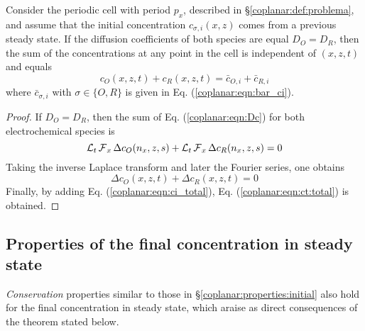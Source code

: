 \begin{corolario}
	\label{coplanar:cor:ct:total}
	Consider the periodic cell with period $p_{x}$,
	described in \S\ref{coplanar:def:problema},
	and assume that the initial concentration $c_{\sigma,i}(x,z)$ comes from a previous steady state.
	If the diffusion coefficients of both species are equal $D_{O} = D_{R}$,
	then the sum of the concentrations at any point in the cell is independent of $(x,z,t)$ and equals
	\begin{equation}
		\label{coplanar:eqn:ct:total}
		c_{O}(x,z,t) + c_{R}(x,z,t) = \bar{c}_{O,i} + \bar{c}_{R,i}
	\end{equation}
	where $\bar{c}_{\sigma,i}$ with $\sigma \in \{O,R\}$ is given in Eq. (\ref{coplanar:eqn:bar_ci}).
\end{corolario}

\begin{proof}
	If $D_{O} = D_{R}$, then the sum of Eq. (\ref{coplanar:eqn:Dc}) for both electrochemical species is
	\begin{equation}
		\operatorname{\mathcal{L}}_{t}\operatorname{\mathcal{F}}_{x} \Delta c_{O}(n_{x},z,s)
		+ \operatorname{\mathcal{L}}_{t}\operatorname{\mathcal{F}}_{x} \Delta c_{R}(n_{x},z,s) = 0
	\end{equation}
	Taking the inverse Laplace transform and later the Fourier series, one obtains
	\begin{equation}
		\Delta c_{O}(x,z,t) + \Delta c_{R}(x,z,t) = 0
	\end{equation}
	Finally, by adding Eq. (\ref{coplanar:eqn:ci_total}), Eq. (\ref{coplanar:eqn:ct:total}) is obtained.
\end{proof}


\subsection{Properties of the final concentration in steady state}

\emph{Conservation} properties similar to those in \S\ref{coplanar:properties:initial}
also hold for the final concentration in steady state,
which araise as direct consequences of the theorem stated below.

